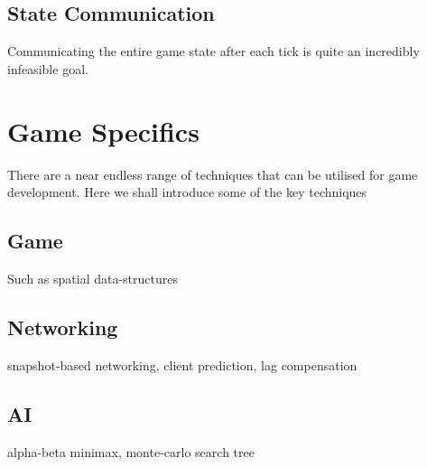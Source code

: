 \documentclass{standalone}
\begin{document}
		\subsection{State Communication}
			Communicating the entire game state after each tick is quite an incredibly infeasible goal.

	\section{Game Specifics}
		There are a near endless range of techniques that can be utilised for game development. Here we shall introduce some of the key techniques

		\subsection{Game}
			Such as spatial data-structures

		\subsection{Networking}
			snapshot-based networking, client prediction, lag compensation

		\subsection{AI}
			alpha-beta minimax, monte-carlo search tree
\end{document}
